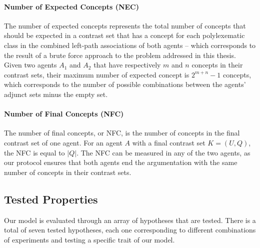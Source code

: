 \paragraph{Number of Expected Concepts (NEC)} The number of expected concepts represents the total number of concepts that should be expected in a contrast set that has a concept for each polylexematic class in the combined left-path associations of both agents -- which corresponds to the result of a brute force approach to the problem addressed in this thesis. Given two agents $A_{1}$ and $A_{2}$ that have respectively $m$ and $n$ concepts in their contrast sets, their maximum number of expected concept is $2^{m+n} - 1$ concepts, which corresponds to the number of possible combinations between the agents' adjunct sets minus the empty set.

\paragraph{Number of Final Concepts (NFC)} The number of final concepts, or NFC, is the number of concepts in the final contrast set of one agent. For an agent $A$ with a final contrast set $K = (U,Q)$, the NFC is equal to $|Q|$. The NFC can be measured in any of the two agents, as our protocol ensures that both agents end the argumentation with the same number of concepts in their contrast sets.

\subsection{Tested Properties}

Our model is evaluated through an array of hypotheses that are tested. There is a total of seven tested hypotheses, each one corresponding to different combinations of experiments and testing a specific trait of our model.

